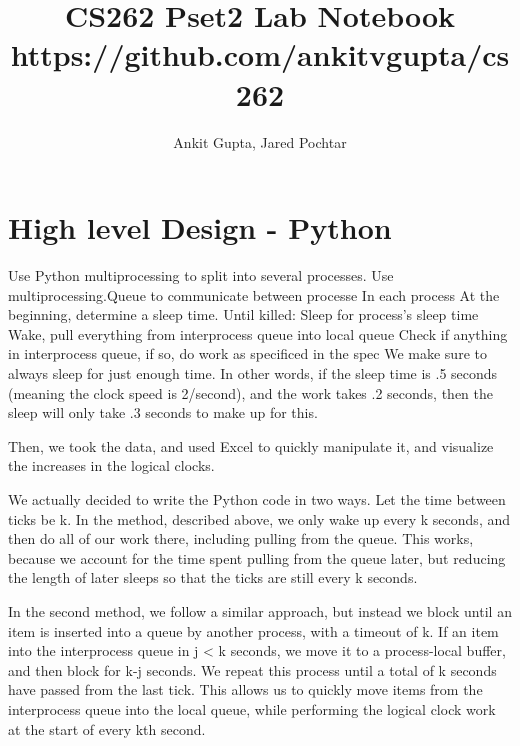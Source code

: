 \documentclass[journal]{IEEEtran}
\begin{document}
%
\title{CS262 Pset2 Lab Notebook \\ \large https://github.com/ankitvgupta/cs262}
%
%
%

\author{Ankit Gupta, Jared Pochtar}


\maketitle

\section{High level Design - Python}
Use Python multiprocessing to split into several processes.
Use multiprocessing.Queue to communicate between processe
In each process
At the beginning, determine a sleep time.
Until killed:
Sleep for process’s sleep time
Wake, pull everything from interprocess queue into local queue
Check if anything in interprocess queue, if so, do work as specificed in the spec
We make sure to always sleep for just enough time. In other words, if the sleep time is .5 seconds (meaning the clock speed is 2/second), and the work takes .2 seconds, then the sleep will only take .3 seconds to make up for this.

Then, we took the data, and used Excel to quickly manipulate it, and visualize the increases in the logical clocks.


We actually decided to write the Python code in two ways. Let the time between ticks be k. In the method, described above, we only wake up every k seconds, and then do all of our work there, including pulling from the queue. This works, because we account for the time spent pulling from the queue later, but reducing the length of later sleeps so that the ticks are still every k seconds.

In the second method, we follow a similar approach, but instead we block until an item is inserted into a queue by another process, with a timeout of k. If an item into the interprocess queue in j < k seconds, we move it to a process-local buffer, and then block for k-j seconds. We repeat this process until a total of k seconds have passed from the last tick. This allows us to quickly move items from the interprocess queue into the local queue, while performing the logical clock work at the start of every kth second.
\end{document}
